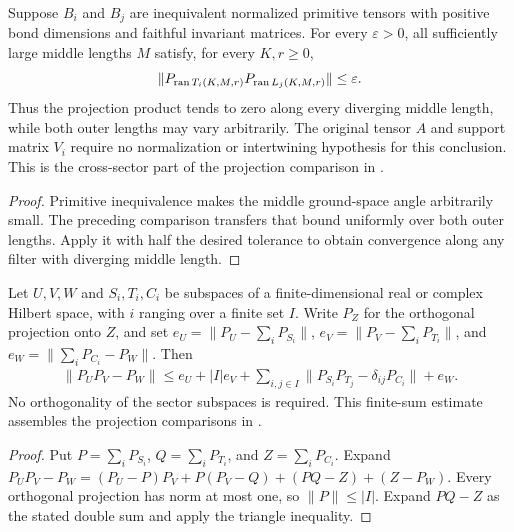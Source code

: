 \begin{lemma}
    \label{thm:residual_window_cross_sector_decay}
    \leanok
    Suppose $B_i$ and $B_j$ are inequivalent normalized primitive tensors
    with positive bond dimensions and faithful invariant matrices.
    For every $\varepsilon>0$, all sufficiently large middle lengths $M$ satisfy, for every $K,r\geq0$,
    \begin{align}
        \|P_{\operatorname{ran}T_i(K,M,r)}
        P_{\operatorname{ran}L_j(K,M,r)}\|\leq\varepsilon.
        \notag
    \end{align}
    Thus the projection product tends to zero along every diverging
    middle length, while both outer lengths may vary arbitrarily.
    The original tensor $A$ and support matrix $V_i$ require no
    normalization or intertwining hypothesis for this conclusion.
    This is the cross-sector part of the projection comparison in
    \cite[Lemmas~disjoint and commutation(ii)]{Nachtergaele1996Spectral}.
\end{lemma}
\begin{proof}\leanok
    Primitive inequivalence makes the middle ground-space angle arbitrarily
    small. The preceding comparison transfers that bound uniformly over
    both outer lengths. Apply it with half the desired tolerance to obtain
    convergence along any filter with diverging middle length.
\end{proof}

\begin{lemma}
    \label{thm:finite_sector_projection_estimate}
    \leanok
    Let $U,V,W$ and $S_i,T_i,C_i$ be subspaces of a finite-dimensional
    real or complex Hilbert space, with $i$ ranging over a finite set $I$.
    Write $P_Z$ for the orthogonal projection onto $Z$, and set
    $e_U=\|P_U-\sum_iP_{S_i}\|$,
    $e_V=\|P_V-\sum_iP_{T_i}\|$, and
    $e_W=\|\sum_iP_{C_i}-P_W\|$. Then
    \begin{align}
        \|P_UP_V-P_W\|
        \leq e_U+|I|e_V+
        \sum_{i,j\in I}\|P_{S_i}P_{T_j}-\delta_{ij}P_{C_i}\|+e_W.
    \end{align}
    No orthogonality of the sector subspaces is required.
    This finite-sum estimate assembles the projection comparisons in
    \cite[Lemmas~commutation(ii) and disjoint]{Nachtergaele1996Spectral}.
\end{lemma}
\begin{proof}\leanok
    Put $P=\sum_iP_{S_i}$, $Q=\sum_iP_{T_i}$, and $Z=\sum_iP_{C_i}$.
    Expand
    $P_UP_V-P_W=(P_U-P)P_V+P(P_V-Q)+(PQ-Z)+(Z-P_W)$.
    Every orthogonal projection has norm at most one, so $\|P\|\leq|I|$.
    Expand $PQ-Z$ as the stated double sum and apply the triangle inequality.
\end{proof}

